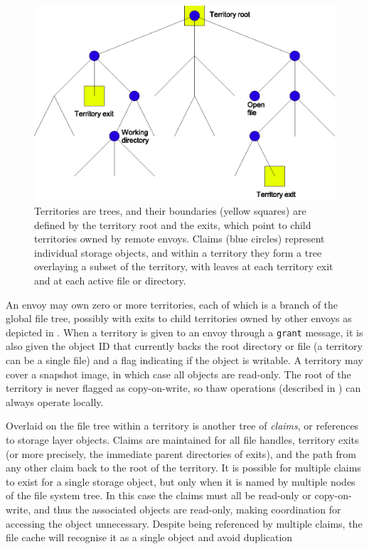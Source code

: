 \begin{figure}[t]
\centering
\includegraphics[width=\figwidth]{figures/territory-claims}
\caption[A territory managed by a single envoy]{Territories are trees, and their boundaries (yellow squares) are defined by the territory root and the exits, which point to child territories owned by remote envoys. Claims (blue circles) represent individual storage objects, and within a territory they form a tree overlaying a subset of the territory, with leaves at each territory exit and at each active file or directory.}
\label{fig:territory-claims}
\end{figure}

An envoy may own zero or more territories, each of which is a branch of the global file tree, possibly with exits to child territories owned by other envoys as depicted in . When a territory is given to an envoy through a \texttt{grant} message, it is also given the object ID that currently backs the root directory or file (a territory can be a single file) and a flag indicating if the object is writable. A territory may cover a snapshot image, in which case all objects are read-only. The root of the territory is never flagged as copy-on-write, so thaw operations (described in ) can always operate locally.

Overlaid on the file tree within a territory is another tree of \emph{claims}, or references to storage layer objects. Claims are maintained for all file handles, territory exits (or more precisely, the immediate parent directories of exits), and the path from any other claim back to the root of the territory. It is possible for multiple claims to exist for a single storage object, but only when it is named by multiple nodes of the file system tree. In this case the claims must all be read-only or copy-on-write, and thus the associated objects are read-only, making coordination for accessing the object unnecessary. Despite being referenced by multiple claims, the file cache will recognise it as a single object and avoid duplication

